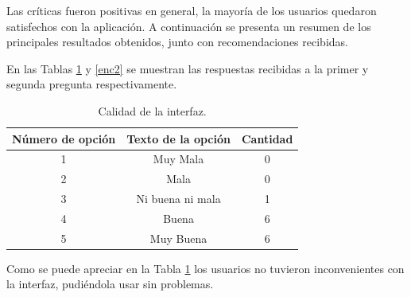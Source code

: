 \documentclass[12pt]{article}
\begin{document}
Las críticas fueron positivas en general, la mayoría de los usuarios quedaron satisfechos con la aplicación. A continuación se presenta un resumen de los principales resultados obtenidos, junto con recomendaciones recibidas.

En las Tablas \ref{enc1} y \ref{enc2} se muestran las respuestas recibidas a la primer y segunda pregunta respectivamente.
\begin{table}[h!]
  \centering
  \begin{tabular}{ccc}
    \toprule
    Número de opción &  Texto de la opción &Cantidad\\
    \midrule
    1 & Muy Mala & 0 \\
    2 & Mala & 0 \\
    3 & Ni buena ni mala & 1 \\
    4 & Buena & 6\\
    5 & Muy Buena & 6\\
    \bottomrule
  \end{tabular}
  \caption{Calidad de la interfaz.}
  \label{enc1}
\end{table}

Como se puede apreciar en la Tabla \ref{enc1} los usuarios no tuvieron inconvenientes con la interfaz, pudiéndola usar sin problemas.
\end{document}
